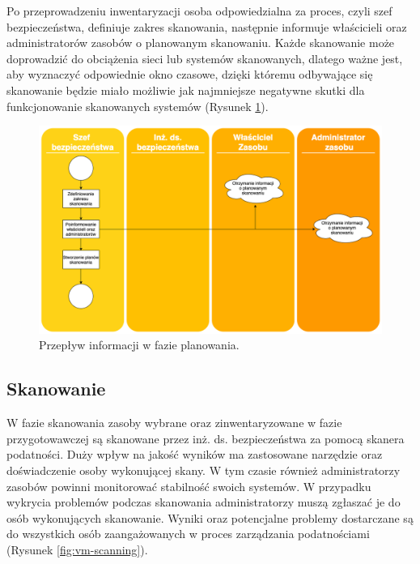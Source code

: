 \bigbreak
Po przeprowadzeniu inwentaryzacji osoba odpowiedzialna za proces, czyli szef bezpieczeństwa, definiuje zakres skanowania, następnie informuje właścicieli oraz administratorów zasobów o planowanym skanowaniu. Każde skanowanie może doprowadzić do obciążenia sieci lub systemów skanowanych, dlatego ważne jest, aby wyznaczyć odpowiednie okno czasowe, dzięki któremu odbywające się skanowanie będzie miało możliwie jak najmniejsze negatywne skutki dla funkcjonowanie skanowanych systemów (Rysunek \ref{fig:vm-prepare}).

\begin{figure}[!ht]
\centering
\includegraphics[width=.9\textwidth]{Chapters/Wstep/p-vm/vm-init.png}
\caption{Przepływ informacji w fazie planowania.}
\label{fig:vm-prepare}
\end{figure}
\FloatBarrier


\subsection{Skanowanie}
W fazie skanowania zasoby wybrane oraz zinwentaryzowane w fazie przygotowawczej są skanowane przez inż. ds. bezpieczeństwa za pomocą skanera podatności. Duży wpływ na jakość wyników ma zastosowane narzędzie oraz doświadczenie osoby wykonującej skany. W tym czasie również administratorzy zasobów powinni monitorować stabilność swoich systemów. W przypadku wykrycia problemów podczas skanowania administratorzy muszą zgłaszać je do osób wykonujących skanowanie. Wyniki oraz potencjalne problemy dostarczane są do wszystkich osób zaangażowanych w proces zarządzania podatnościami (Rysunek \ref{fig:vm-scanning}).

